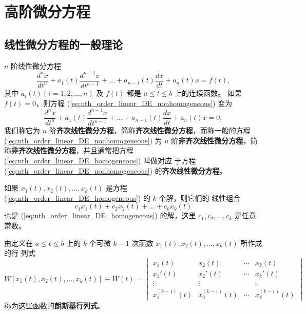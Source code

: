 \chapter{高阶微分方程}\label{chap:高阶微分方程}
\section{线性微分方程的一般理论}\label{sec:线性微分方程的一般理论}
\begin{definition}[n阶线性微分方程]\label{def:n阶线性微分方程}
    $n$ 阶线性微分方程
\begin{equation}
\frac{d^n x}{dt^n} + a_1(t)\frac{d^{n-1} x}{dt^{n-1}} + \dots + a_{n-1}(t)\frac{dx}{dt} + a_n(t)x = f(t), \label{eq:nth_order_linear_DE_nonhomogeneous}
\end{equation}
其中 $a_i(t)(i=1,2,\dots,n)$ 及 $f(t)$ 都是 $a \le t \le b$ 上的连续函数。
如果 $f(t)=0$，则方程 (\ref{eq:nth_order_linear_DE_nonhomogeneous}) 变为
\begin{equation}
\frac{d^n x}{dt^n} + a_1(t)\frac{d^{n-1} x}{dt^{n-1}} + \dots + a_{n-1}(t)\frac{dx}{dt} + a_n(t)x = 0, \label{eq:nth_order_linear_DE_homogeneous}
\end{equation}
我们称它为 $n$ 阶\textbf{齐次线性微分方程}，简称\textbf{齐次线性微分方程}，而称一般的方程 (\ref{eq:nth_order_linear_DE_nonhomogeneous}) 为 $n$ 阶\textbf{非齐次线性微分方程}，简称\textbf{非齐次线性微分方程}，并且通常把方程 (\ref{eq:nth_order_linear_DE_homogeneous}) 叫做对应
于方程 (\ref{eq:nth_order_linear_DE_nonhomogeneous}) 的\textbf{齐次线性微分方程}。
\end{definition}

\begin{theorem}[叠加原理]\label{thm:superposition_principle}
如果 $x_1(t), x_2(t), \dots, x_k(t)$ 是方程 (\ref{eq:nth_order_linear_DE_homogeneous}) 的 $k$ 个解，则它们的
线性组合
$$c_1x_1(t)+c_2x_2(t)+\dots+c_kx_k(t)$$
也是 (\ref{eq:nth_order_linear_DE_homogeneous}) 的解，这里 $c_1,c_2,\dots,c_k$ 是任意常数。
\end{theorem}

\begin{definition}[朗斯基行列式]\label{def:Wronskian}
由定义在 $a \le t \le b$ 上的 $k$ 个可微 $k-1$ 次函数 $x_1(t), x_2(t), \dots, x_k(t)$ 所作成的行
列式
$$W[x_1(t), x_2(t), \dots, x_k(t)] \equiv W(t) = \begin{vmatrix}
x_1(t) & x_2(t) & \cdots & x_k(t) \\
x_1'(t) & x_2'(t) & \cdots & x_k'(t) \\
\vdots & \vdots & & \vdots \\
x_1^{(k-1)}(t) & x_2^{(k-1)}(t) & \cdots & x_k^{(k-1)}(t)
\end{vmatrix}$$
称为这些函数的\textbf{朗斯基行列式}。
\end{definition}

